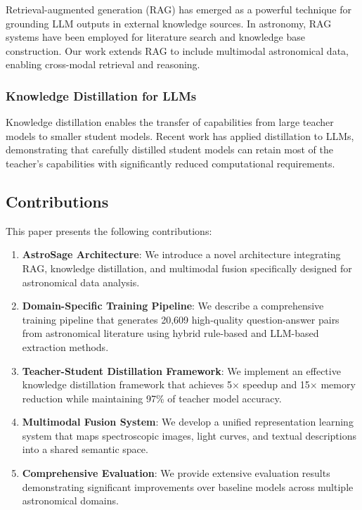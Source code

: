 \documentclass[11pt,a4paper]{article}
\begin{document}
Retrieval-augmented generation (RAG) has emerged as a powerful technique for grounding LLM outputs in external knowledge sources. In astronomy, RAG systems have been employed for literature search and knowledge base construction. Our work extends RAG to include multimodal astronomical data, enabling cross-modal retrieval and reasoning.

\subsubsection{Knowledge Distillation for LLMs}

Knowledge distillation enables the transfer of capabilities from large teacher models to smaller student models. Recent work has applied distillation to LLMs, demonstrating that carefully distilled student models can retain most of the teacher's capabilities with significantly reduced computational requirements.

\subsection{Contributions}

This paper presents the following contributions:

\begin{enumerate}
    \item \textbf{AstroSage Architecture}: We introduce a novel architecture integrating RAG, knowledge distillation, and multimodal fusion specifically designed for astronomical data analysis.
    
    \item \textbf{Domain-Specific Training Pipeline}: We describe a comprehensive training pipeline that generates 20,609 high-quality question-answer pairs from astronomical literature using hybrid rule-based and LLM-based extraction methods.
    
    \item \textbf{Teacher-Student Distillation Framework}: We implement an effective knowledge distillation framework that achieves 5$\times$ speedup and 15$\times$ memory reduction while maintaining 97\% of teacher model accuracy.
    
    \item \textbf{Multimodal Fusion System}: We develop a unified representation learning system that maps spectroscopic images, light curves, and textual descriptions into a shared semantic space.
    
    \item \textbf{Comprehensive Evaluation}: We provide extensive evaluation results demonstrating significant improvements over baseline models across multiple astronomical domains.
\end{enumerate}
\end{document}
